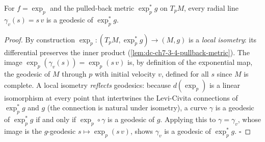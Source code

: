 \begin{lemma}
  \label{lem:dc-ch7-3-4-rays-are-geodesics}
  \leanok
  For $f=\exp_p$ and the pulled-back metric $\exp_p^*g$ on $T_pM$, every radial line
  $\gamma_v(s)=s\,v$ is a geodesic of $\exp_p^*g$.
\end{lemma}
\begin{proof}
  \leanok
  By construction $\exp_p:(T_pM,\exp_p^*g)\to(M,g)$ is a \emph{local isometry}: its
  differential preserves the inner product (\cref{lem:dc-ch7-3-4-pullback-metric}).
  The image $\exp_p(\gamma_v(s))=\exp_p(s\,v)$ is, by definition of the exponential map,
  the geodesic of $M$ through $p$ with initial velocity $v$, defined for all $s$ since
  $M$ is complete. A local isometry \emph{reflects} geodesics: because $d(\exp_p)$
  is a linear isomorphism at every point that intertwines the Levi-Civita connections
  of $\exp_p^*g$ and $g$ (the connection is natural under isometry), a curve $\gamma$
  is a geodesic of $\exp_p^*g$ if and only if $\exp_p\circ\gamma$ is a geodesic of $g$.
  Applying this to $\gamma=\gamma_v$, whose image is the $g$-geodesic $s\mapsto\exp_p(s\,v)$,
  shows $\gamma_v$ is a geodesic of $\exp_p^*g$. $\square$
\end{proof}

